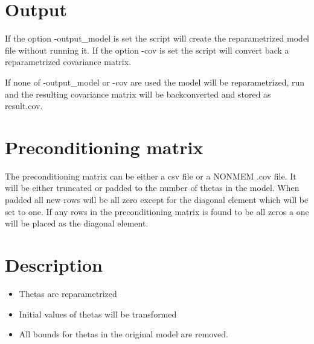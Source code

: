 \section{Output}

If the option -output\_model is set the script will create the reparametrized model file without running it.
If the option -cov is set the script will convert back a reparametrized covariance matrix.

If none of -output\_model or -cov are used the model will be reparametrized, run and the resulting covariance matrix will be
backconverted and stored as result.cov.


\section{Preconditioning matrix}

The preconditioning matrix can be either a csv file or a NONMEM .cov file. It will be either truncated or padded to the number of thetas in the model.
When padded all new rows will be all zero except for the diagonal element which will be set to one. If any rows in the preconditioning matrix is found
to be all zeros a one will be placed as the diagonal element.

\section{Description}

\begin{itemize}
	\item Thetas are reparametrized
	\item Initial values of thetas will be transformed
	\item All bounds for thetas in the original model are removed.
\end{itemize}



